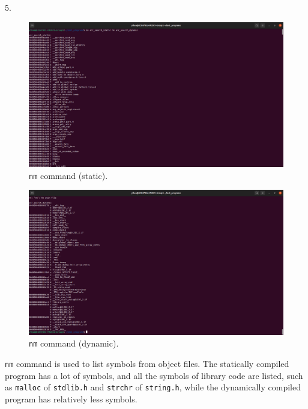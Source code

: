 \documentclass[a4paper]{article}
\begin{document}
5.
\begin{figure}[H]
    \centering
    \includegraphics[width=1\textwidth]{4.png}
    \caption{\texttt{nm} command (static).}
\end{figure}
\begin{figure}[H]
    \centering
    \includegraphics[width=1\textwidth]{5.png}
    \caption{\texttt{nm} command (dynamic).}
\end{figure}
\texttt{nm} command is used to list symbols from object files. The statically compiled program has a lot of symbols, and all the symbols of library code are listed, such as \texttt{malloc} of \texttt{stdlib.h} and \texttt{strchr} of \texttt{string.h}, while the dynamically compiled program has relatively less symbols.
\end{document}
